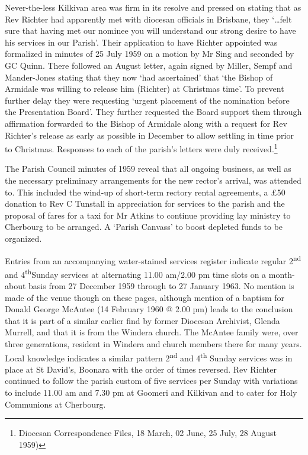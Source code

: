 Never-the-less Kilkivan area was firm in its resolve and pressed on
stating that as Rev Richter had apparently met with diocesan officials
in Brisbane, they `\ldots felt sure that having met our nominee you will
understand our strong desire to have his services in our Parish'. Their
application to have Richter appointed was formalized in minutes of 25
July 1959 on a motion by Mr Sing and seconded by GC Quinn. There
followed an August letter, again signed by Miller, Sempf and
Mander-Jones stating that they now `had ascertained' that `the Bishop of
Armidale was willing to release him (Richter) at Christmas time'. To
prevent further delay they were requesting `urgent placement of the
nomination before the Presentation Board'. They further requested the
Board support them through affirmation forwarded to the Bishop of
Armidale along with a request for Rev Richter's release as early as
possible in December to allow settling in time prior to Christmas.
Responses to each of the parish's letters were duly received.\footnote{Diocesan
  Correspondence Files, 18 March, 02 June, 25 July, 28 August 1959)}

The Parish Council minutes of 1959 reveal that all ongoing business, as
well as the necessary preliminary arrangements for the new rector's
arrival, was attended to. This included the wind-up of short-term
rectory rental agreements, a \pounds50 donation to Rev C Tunstall in
appreciation for services to the parish and the proposal of  fares for
a taxi for Mr Atkins to continue providing lay ministry to Cherbourg to
be arranged. A `Parish Canvass' to boost depleted funds to be organized.

Entries from an accompanying water-stained services register indicate
regular 2\textsuperscript{nd} and 4\textsuperscript{th}Sunday services
at alternating 11.00 am/2.00 pm time slots on a month-about basis from
27 December 1959 through to 27 January 1963. No mention is made of the
venue though on these pages, although mention of a baptism for Donald
George McAntee (14 February 1960 @ 2.00 pm) leads to the conclusion that
it is part of a similar earlier find by former Diocesan Archivist,
Glenda Murrell, and that it is from the Windera church. The McAntee
family were, over three generations, resident in Windera and church
members there for many years. Local knowledge indicates a similar
pattern 2\textsuperscript{nd} and 4\textsuperscript{th} Sunday services
was in place at St David's, Boonara with the order of times reversed.
Rev Richter continued to follow the parish custom of five services per
Sunday with variations to include 11.00 am and 7.30 pm at Goomeri and
Kilkivan and to cater for Holy Communions at Cherbourg.

